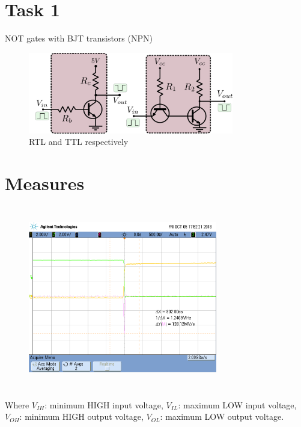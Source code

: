 \newpage
\section*{Task 1}
NOT gates with BJT transistors (NPN)

\begin{figure}[H] 
\begin{center}
\includegraphics[width=0.80\textwidth]{data/1total.png}
\end{center}
\caption{RTL and TTL respectively}
\label{fig:ej1a}
\end{figure} 


\section*{Measures}
\begin{figure}[H] 
\begin{center}
\includegraphics[width=8.25cm,height=8cm]{data/imax1.png}
\end{center}
\caption{}
\label{fig:measures}
\end{figure} 

Where $V_{IH}$: minimum HIGH input voltage, $V_{IL}$: maximum LOW input voltage, $V_{OH}$: minimum HIGH output voltage, $V_{OL}$: maximum LOW output voltage.

